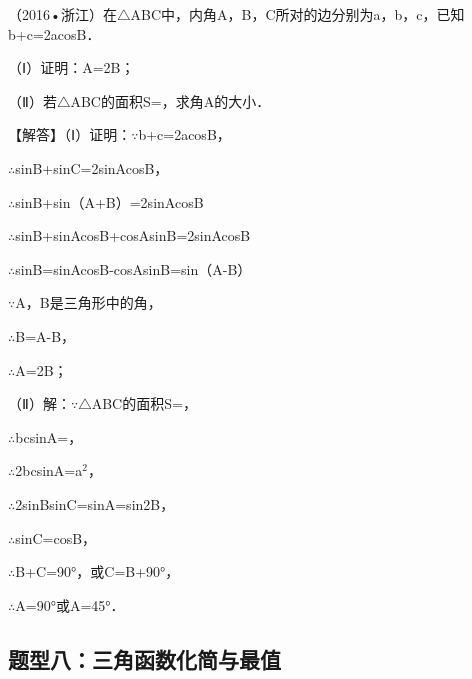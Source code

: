 \begin{question}
（2016•浙江）在$\triangle$ABC中，内角A，B，C所对的边分别为a，b，c，已知b+c=2acosB．\par
（Ⅰ）证明：A=2B；\par
（Ⅱ）若$\triangle$ABC的面积S=\allowbreak{}，求角A的大小．\par
\begin{solution}
【解答】（Ⅰ）证明：$\because$b+c=2acosB，\par
$\therefore$sinB+sinC=2sinAcosB，\par
$\therefore$sinB+sin（A+B）=2sinAcosB\par
$\therefore$sinB+sinAcosB+cosAsinB=2sinAcosB\par
$\therefore$sinB=sinAcosB-cosAsinB=sin（A-B）\par
$\because$A，B是三角形中的角，\par
$\therefore$B=A-B，\par
$\therefore$A=2B；\par
（Ⅱ）解：$\because$$\triangle$ABC的面积S=\allowbreak{}，\par
$\therefore$\allowbreak{}bcsinA=\allowbreak{}，\par
$\therefore$2bcsinA=a$^{2}$，\par
$\therefore$2sinBsinC=sinA=sin2B，\par
$\therefore$sinC=cosB，\par
$\therefore$B+C=90°，或C=B+90°，\par
$\therefore$A=90°或A=45°．\par
\end{solution}
\end{question}

\subsection{题型八：三角函数化简与最值}

